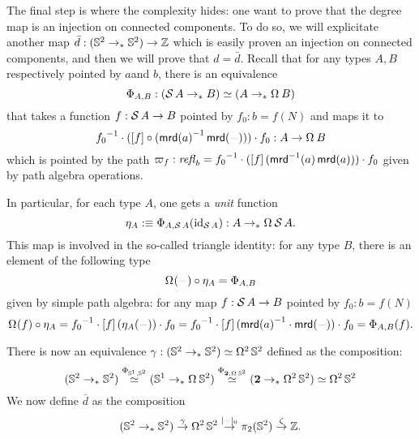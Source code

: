 \documentclass[english,a4]{article}
\renewcommand{\ap}[1]{\left[{#1}\right]}
\newcommand{\ptdto}{\to_\ast}%
\newcommand{\settrunc}[1]{\trunc{#1}_0}
\begin{document}
The final step is where the complexity hides: one want to prove that the degree
map is an injection on connected components. To do so, we will explicitate
another map $\bar d: (\Sp \ptdto \Sp) \to \ZZ$ which is easily proven an
injection on connected components, and then we will prove that $d = \bar d$.
Recall that for any types $A,B$ respectively pointed by $a$and $b$, there is an
equivalence
\begin{displaymath}
  \Phi_{A,B}: (\susp A \ptdto B) \weq (A \ptdto \loopspace \null B) 
\end{displaymath}
that takes a function $f:\operatorname{\mathcal S} A \to B$ pointed by $f_0:b=f(N)$ and maps it to 
\begin{displaymath}
  \inv {f_0}\cdot (\ap f\circ (\inv{\mrd(a)}\mrd(\blank)))\cdot f_0 : A \to \loopspace\null B
\end{displaymath}
which is pointed by the path $\varpi_{f}:\refl b = \inv {f_0} \cdot (\ap f (\inv
\mrd(a)\mrd(a))) \cdot f_0$ given by path algebra operations.

In particular, for each type $A$, one gets a {\em unit} function 
\begin{displaymath}
  \eta_A \defequi \Phi_{A,\susp A}(\id_{\susp A}): A \ptdto \loopspace\null\susp A.
\end{displaymath}
This map is involved in the so-called triangle identity: for any type $B$,
there is an element of the following type
\begin{equation}
  \loopspace\null(\blank) \circ \eta_A = \Phi_{A,B}
  \label{eq:triangle-identity-unit}
\end{equation}
given by simple path algebra: for any map $f:\operatorname{\mathcal S} A \to B$ pointed by $f_0:b=f(N)$
\begin{displaymath}
  \loopspace\null(f) \circ \eta_A = \inv {f_0} \cdot \ap f (\eta_A(\blank)) \cdot f_0 
  = \inv {f_0} \cdot \ap f (\inv{\mrd(a)}\cdot\mrd(\blank)) \cdot f_0 = \Phi_{A,B}(f). 
\end{displaymath}

There is now an equivalence $\gamma:(\Sp \ptdto \Sp) \weq \loopspace 2 \Sp$ defined as
the composition:
\begin{displaymath}
  (\Sp \ptdto \Sp) \stackrel{\Phi_{\Sc,\Sp}}\weq (\Sc \ptdto\loopspace\null \Sp)
  \stackrel{\Phi_{\bn 2,\loopspace\null\Sp}}\weq (\bn 2\ptdto\loopspace 2 \Sp) \weq \loopspace 2 \Sp
\end{displaymath}
We now define $\bar d$ as the composition
\begin{displaymath}
  (\Sp \ptdto \Sp) \stackrel \gamma \to \loopspace 2 \Sp \stackrel {\settrunc\blank} \to 
  \pi_2(\Sp) \stackrel \zeta \to \ZZ.
\end{displaymath}
\end{document}
